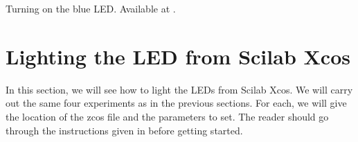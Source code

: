 \begin{scicode}
  {Turning on the blue LED.  Available at
    .}
  \label{sci:led-blue}
  
\end{scicode}

\begin{scicode}
  \label{sci:led-blue-delay}
  
\end{scicode}

\begin{scicode}
  \label{sci:led-blue-red}
  
\end{scicode}

\begin{scicode}
  \label{sci:led-green-blink}
  
\end{scicode}


\section{Lighting the LED from Scilab Xcos}
\label{sec:light-xcos}
In this section, we will see how to light the LEDs from Scilab Xcos.
We will carry out the same four experiments as in the previous
sections.  For each, we will give the location
of the zcos file and the parameters to set.  The reader should go
through the instructions given in  before
getting started.

